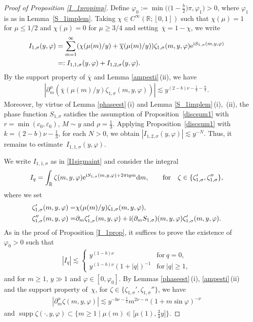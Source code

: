 \documentclass[10pt,a4paper]{amsart}
\numberwithin{equation}{section}
\def\R{\mathbb{R}}%
\DeclareMathOperator{\supp}{supp}%
\def\a{\alpha}
\def\e{\varepsilon}
\def\f{\varphi}
\def\m{\mu}
\def\n{\nu}
\def\s{\sigma}
\def\z{\zeta}
\def\pa{\partial}
\begin{document}
\begin{proof}[Proof of Proposition \ref{I_1propimp}]
Define $\f_0:=\min\bigl(\bigl(1-\frac{b}{2}\bigr)\pi,\f_1\bigr)>0$, where $\f_1$ is as in Lemma~\ref{S_1implem}.
Taking $\chi\in C^{\infty}(\R;[0,1])$ such that $\chi(\m)=1$ for $\m\leq 1/2$ and $\chi(\m)=0$ for $\m\geq 3/4$ and setting~${\overline{\chi}=1-\chi}$, we write
\begin{align*}
I_{1,\s}(y,\f)&= \sum_{m=1}^{\infty}(\chi(\m(m)/y)+\overline{\chi}(\m(m)/y)) \z_{1,\s}(m,y,\f){\rm e}^{{\rm i}S_{1,\s}(m,y,\f)} \\
&=: I_{1,1,\s}(y,\f)+I_{1,2,\s}(y,\f).
\end{align*}
By the support property of $\overline{\chi}$ and Lemma \ref{ampesti}\,(ii), we have
\begin{align*}
|\pa_{m}^{\a}(\overline{\chi}(\m(m)/y)\z_{1,\s}(m,y,\f))|\lesssim y^{(2-b)\n-\frac{1}{3}-\frac{\a}{3}}.
\end{align*}
Moreover, by virtue of Lemma \ref{phaseest}\,(i) and Lemma \ref{S_1implem}\,(i),~(ii), the phase function $S_{1,\s}$ satisfies the assumption of Proposition~\ref{discsum1} with $r=\min(c_0,\e_0)$, $M\sim y$ and $\rho=\frac{1}{3}$. Applying Proposition~\ref{discsum1} with $k=(2-b)\n-\frac{1}{3}$, for each $N>0$, we obtain $|I_{1,2,\s}(y,\f)|\lesssim y^{-N}$. Thus, it remains to estimate~${I_{1,1,\s}(y,\f)}$.

We write $I_{1,1,\s}$ as in \eqref{I1sigmaint} and consider the integral
\begin{align*}
I_{q}=\int_{\R}\z(m,y,\f){\rm e}^{{\rm i}S_{1,\s}(m,y,\f)+2\pi {\rm i}qm}{\rm d}m, \qquad \text{for}\quad \z\in \{\z_{1,\s}',\z_{1,\s}''\},
\end{align*}
where we set
\begin{align*}
\z'_{1,\s}(m,y,\f)=&\chi(\m(m)/y)\z_{1,\s}(m,y,\f),\\
\z''_{1,\s}(m,y,\f)=&\pa_m\z_{1,\s}'(m,y,\f)+{\rm i}(\pa_mS_{1,\s})(m,y,\f)\z_{1,\s}'(m,y,\f).
\end{align*}
As in the proof of Proposition \ref{I_1prop}, it suffices to prove the existence of $\f_0>0$ such that
\begin{align}\label{I_qest2}
|I_q|\lesssim \begin{cases}
y^{(1-b)\n}& \text{for}\  q=0,\\
y^{(1-b)\n}(1+|q|)^{-1}& \text{for}\  |q|\geq 1,
\end{cases}
\end{align}
and for $m\geq 1$, $y\gg 1$ and $\f\in [0,\f_0]$.
By Lemmas \ref{phaseest}\,(i), \ref{ampesti}\,(ii) and the support property of~$\chi$, for $\z\in\{\z_{1,\s}',\z_{1,\s}''\}$, we have
\begin{align}\label{zetapart2symbolest}
|\pa_m^{\a}\z(m,y,\f)|\lesssim y^{-b\n-\frac{1}{2}}m^{2\n-\a}(1+m\sin \f)^{-\n}
\end{align}
and $\supp \z(\cdot,y,\f)\subset \big\{m\geq 1\mid \m(m)\in \bigl[\m(1),\frac{3}{4}y\bigr]\big\}$.


\end{proof}
\end{document}
